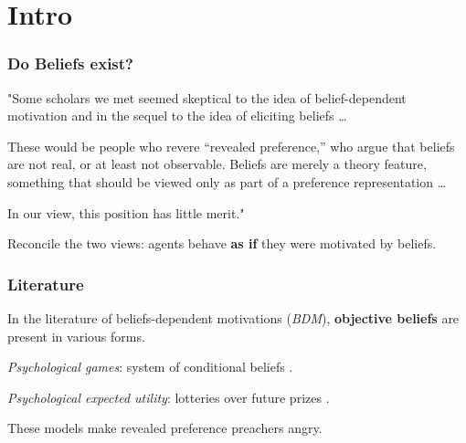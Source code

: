 \documentclass[usenames,dvipsnames,aspectratio=169,11pt,envcountsect, handout]{beamer}
\begin{document}
\section{Intro}

\begin{frame}
	\maketitle

\end{frame}

\begin{frame}\frametitle{Do Beliefs exist?}


	"Some scholars we met seemed skeptical to the idea of belief-dependent motivation and in the sequel to the idea of eliciting beliefs \dots


	\vfill


	These would be people who revere “revealed preference,” who argue that beliefs are not real, or at least not observable. Beliefs are merely a theory feature, something that should be viewed only as part of a preference representation \dots

	\vfill

	In our view, this position has little merit." \citep{battigalliBeliefdependentMotivationsPsychological2022}


	\vfill

	Reconcile the two views: agents behave \textbf{as if} they were motivated by beliefs.

\end{frame}


\begin{frame}\frametitle{Literature}

	In the literature of  beliefs-dependent motivations (\textit{BDM}), \textbf{objective beliefs} are present in various forms.

	\vfill

	\begin{wideitemize}
		\item \textit{Psychological games}: system of conditional beliefs \citep{battigalliBeliefdependentMotivationsPsychological2022}.
		\item \textit{Psychological expected utility}: lotteries over future prizes \citep{caplinPsychologicalExpectedUtility2001}.
	\end{wideitemize}

	\vfill

	These models make revealed preference preachers angry.

\end{frame}
\end{document}
